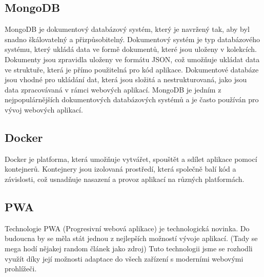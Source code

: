 \subsection{MongoDB}
MongoDB je dokumentový databázový systém, který je navržený tak, aby byl snadno škálovatelný a přizpůsobitelný. Dokumentový systém je typ databázového systému, který ukládá data ve formě dokumentů, které jsou uloženy v kolekcích. Dokumenty jsou zpravidla uloženy ve formátu JSON, což umožňuje ukládat data ve struktuře, která je přímo použitelná pro kód aplikace. Dokumentové databáze jsou vhodné pro ukládání dat, která jsou složitá a nestrukturovaná, jako jsou data zpracovávaná v rámci webových aplikací. MongoDB je jedním z nejpopulárnějších dokumentových databázových systémů a je často používán pro vývoj webových aplikací.

\subsection{Docker}
Docker je platforma, která umožňuje vytvářet, spouštět a sdílet aplikace pomocí kontejnerů. Kontejnery jsou izolovaná prostředí, která společně balí kód a závislosti, což usnadňuje nasazení a provoz aplikací na různých platformách.

\subsection{PWA}
Technologie PWA (Progresivní webová aplikace) je technologická novinka. Do budoucna by se měla stát jednou z nejlepších možností vývoje aplikací. (Tady se mega hodí nějakej random článek jako zdroj)
Tuto technologii jsme se rozhodli využít díky její možnosti adaptace do všech zařízení s moderními webovými prohlížeči.
